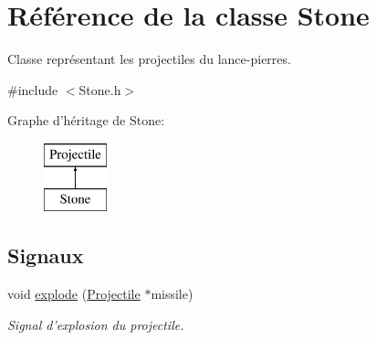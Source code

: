 \hypertarget{classStone}{
\section{Référence de la classe Stone}
\label{classStone}
}


Classe représentant les projectiles du lance-\/pierres.  




{\ttfamily \#include $<$Stone.h$>$}

Graphe d'héritage de Stone:\begin{figure}[H]
\begin{center}
\leavevmode
\includegraphics[height=2.000000cm]{classStone}
\end{center}
\end{figure}
\subsection*{Signaux}
\begin{DoxyCompactItemize}
\item 
void \hyperlink{classProjectile_a18d1fccd74f92b54f239c13c74cbc00c}{explode} (\hyperlink{classProjectile}{Projectile} $\ast$missile)
\begin{DoxyCompactList}\small\item\em Signal d'explosion du projectile. \end{DoxyCompactList}\end{DoxyCompactItemize}
